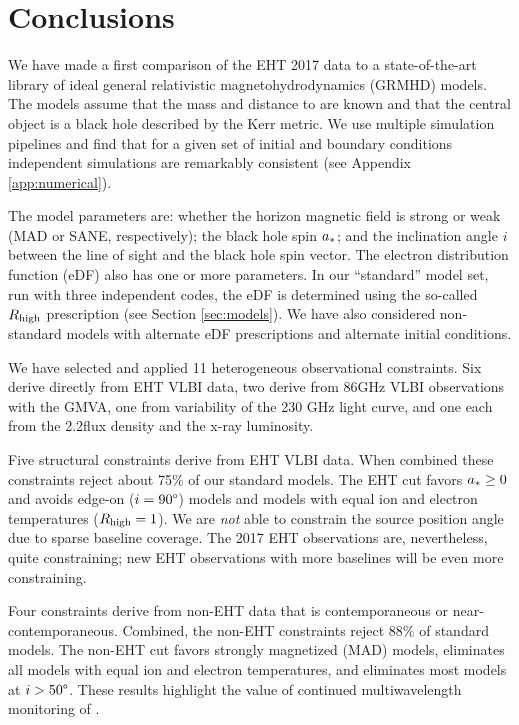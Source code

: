 \section{Conclusions}
\label{sec:conclusions}

We have made a first comparison of the EHT 2017 \sgra data to a state-of-the-art library of ideal general relativistic magnetohydrodynamics (GRMHD) models.  The models assume that the mass and distance to \sgra are known and that the central object is a black hole described by the Kerr metric. We use multiple simulation pipelines and find that for a given set of initial and boundary conditions independent simulations are remarkably consistent (see Appendix \ref{app:numerical}).

The model parameters are: whether the horizon magnetic field is strong or weak (MAD or SANE, respectively); the black hole spin $a_*$; and the inclination angle $i$ between the line of sight and the black hole spin vector.  The electron distribution function (eDF) also has one or more parameters. In our ``standard'' model set, run with three independent codes, the eDF is determined using the so-called $R_\mathrm{high}$ prescription (see Section \ref{sec:models}).  We have also considered non-standard models with alternate eDF prescriptions and alternate initial conditions.

We have selected and applied 11 heterogeneous observational constraints.  Six derive directly from EHT VLBI data, two derive from 86GHz VLBI observations with the GMVA, one from variability of the 230 GHz light curve, and one each from the 2.2\um flux density and the x-ray luminosity.

Five structural constraints derive from EHT VLBI data.  When combined these constraints reject about 75\% of our standard models.  The EHT cut favors $a_* \ge 0$ and avoids edge-on ($i = 90\degree$) models and models with equal ion and electron temperatures ($R_\mathrm{high} = 1$).  We are {\em not} able to constrain the source position angle due to sparse baseline coverage.  The 2017 EHT observations are, nevertheless, quite constraining; new EHT observations with more baselines will be even more constraining.

Four constraints derive from non-EHT data that is contemporaneous or near-contemporaneous.  Combined, the non-EHT constraints reject 88\% of standard models.  The non-EHT cut favors strongly magnetized (MAD) models, eliminates all models with equal ion and electron temperatures, and eliminates most models at $i > 50\degree$.  These results highlight the value of continued multiwavelength monitoring of \sgra.

